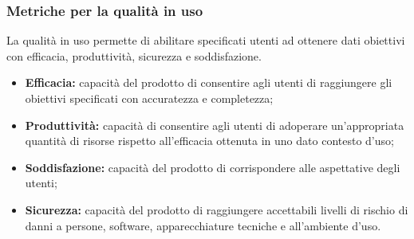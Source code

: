 \subsubsection{Metriche per la qualità in uso}
La qualità in uso permette di abilitare specificati utenti ad ottenere dati obiettivi con efficacia, produttività, sicurezza e soddisfazione.
\begin{itemize}
    \item \textbf{Efficacia:} capacità del prodotto di consentire agli utenti di raggiungere gli obiettivi specificati con accuratezza e completezza;
    \item \textbf{Produttività:} capacità di consentire agli utenti di adoperare un'appropriata quantità di risorse rispetto all'efficacia ottenuta in uno dato contesto d'uso;
    \item \textbf{Soddisfazione:} capacità del prodotto di corrispondere alle aspettative degli utenti;
    \item \textbf{Sicurezza:} capacità del prodotto di raggiungere accettabili livelli di rischio di danni a persone, software, apparecchiature tecniche e all'ambiente d'uso.
\end{itemize}